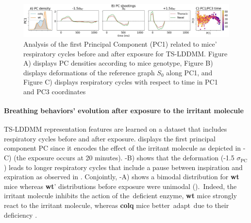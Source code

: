 \begin{figure}[t]
  \centering
  \includegraphics[width=0.95\linewidth]{"./pictures/exp2.pdf"}
  \caption{Analysis of the first Principal Component (PC1) related to mice' respiratory cycles before and after exposure for TS-LDDMM. Figure A) displays PC densities according to mice genotype, Figure B) displays  deformations of the reference graph $S_0$ along PC1, and Figure C) displays respiratory cycles with respect to time in PC1 and PC3 coordinates}
  \label{fig:exp_2_PCA}
  \vspace{-1.5em}
\end{figure}
\vspace{-1ex}
\paragraph{Breathing behaviors' evolution after exposure to the irritant molecule} 
TS-LDDMM representation features are learned on a dataset that includes respiratory cycles before and after exposure.
  displays the first principal component PC since it encodes the effect of the irritant molecule as depicted in -C) (the exposure occurs at 20 minutes). -B) shows that the deformation (-1.5 $\sigma_{\text{PC}}$) leads to longer respiratory cycles that include a pause between inspiration and expiration as observed in \cite{germain2023unsupervised}.
  Conjointly, -A) shows a bimodal distribution for \textbf{wt} mice whereas \textbf{wt}' distributions before exposure were unimodal (). Indeed, the irritant molecule inhibits the action of the deficient enzyme, \textbf{wt} mice strongly react to the irritant molecule, whereas \textbf{colq} mice better adapt due to their deficiency \cite{germain2023unsupervised}.
%
